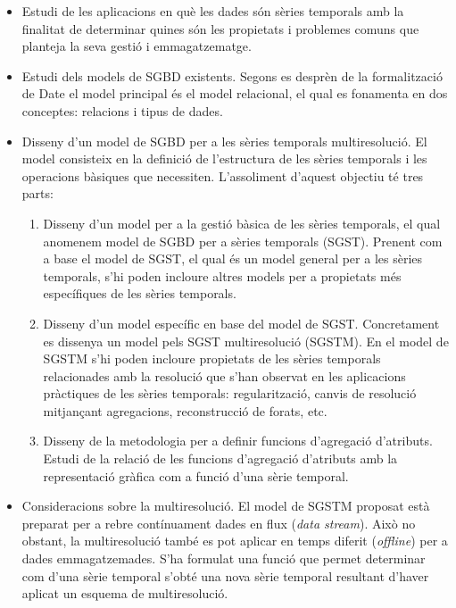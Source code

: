 \documentclass{scrartcl}
\begin{document}
\begin{itemize}

\item Estudi de les aplicacions en què les dades són sèries temporals
  amb la finalitat de determinar quines són les propietats i problemes
  comuns que planteja la seva gestió i emmagatzematge.

\item Estudi dels models de SGBD existents. Segons es desprèn de la
  formalització de Date%
  el model principal és el model relacional, el qual es fonamenta en
  dos conceptes: relacions i tipus de dades.


\item Disseny d'un model de SGBD per a les sèries temporals
  multiresolució. El model consisteix en la definició de l'estructura de les
  sèries temporals i les operacions bàsiques que necessiten.
  L'assoliment d'aquest objectiu té tres parts:

  \begin{enumerate}
  \item Disseny d'un model per a la gestió bàsica de les sèries
    temporals, el qual anomenem model de SGBD per a sèries temporals
    (SGST).  
    Prenent com a base el model de SGST, el qual és un model general
    per a les sèries temporals, s'hi poden incloure altres models per
    a propietats més específiques de les sèries temporals.

  \item Disseny d'un model específic en base del model de
    SGST. Concretament es dissenya un model pels SGST multiresolució
    (SGSTM).  En el model de SGSTM s'hi poden incloure propietats de
    les sèries temporals relacionades amb la resolució que s'han
    observat en les aplicacions pràctiques de les sèries temporals:
    regularització, canvis de resolució mitjançant agregacions,
    reconstrucció de forats, etc.
 
  \item Disseny de la metodologia per a definir funcions d'agregació
    d'atributs. Estudi de la relació de les funcions d'agregació
    d'atributs amb la representació gràfica com a funció d'una sèrie
    temporal.


  \end{enumerate}

\item Consideracions sobre la multiresolució.  El model de SGSTM
  proposat està preparat per a rebre contínuament dades en flux
  (\emph{data stream}). Això no obstant, la multiresolució també es
  pot aplicar en temps diferit (\emph{offline}) per a dades
  emmagatzemades. S'ha formulat una funció que permet determinar com
  d'una sèrie temporal s'obté una nova sèrie temporal resultant
  d'haver aplicat un esquema de multiresolució.


\end{itemize}
\end{document}
